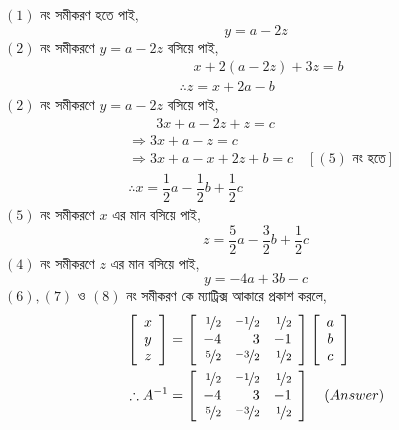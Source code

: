 $(1)$ নং সমীকরণ হতে পাই, 
\begin{equation}
	y=a-2z \tag{4}
\end{equation}
$(2)$ নং সমীকরণে $y=a-2z$ বসিয়ে পাই, 
\begin{align}
	& \quad x+2(a-2z)+3z=b \nonumber \\
	& \therefore z=x+2a-b \tag{5}
\end{align}
$(2)$ নং সমীকরণে $y=a-2z$ বসিয়ে পাই, 
\begin{align}
	& \quad \quad 3x+a-2z+z=c \nonumber \\
	& \Rightarrow 3x+a-z=c \nonumber \\
	& \Rightarrow 3x+a-x+2z+b=c \quad [(5) \text{ নং হতে}] \nonumber \\
	& \therefore x=\dfrac{1}{2}a-\dfrac{1}{2}b+\dfrac{1}{2}c \tag{6}
\end{align}
$(5)$ নং সমীকরণে $x$ এর মান বসিয়ে পাই, 
\begin{equation}
	z=\dfrac{5}{2}a-\dfrac{3}{2}b+\dfrac{1}{2}c \tag{7}
\end{equation}
$(4)$ নং সমীকরণে $z$ এর মান বসিয়ে পাই, 
\begin{equation}
	y=-4a+3b-c \tag{8}
\end{equation}
$(6),(7)$ ও $(8)$ নং সমীকরণ কে ম্যাট্রিক্স আকারে প্রকাশ করলে,
\begin{align*}
	\left[\begin{array}{c}
	x \\
	y \\
	z
	\end{array}\right] &= \left[\begin{array}{rrr}
	\nicefrac{1}{2} & \nicefrac{-1}{2} & \nicefrac{1}{2} \\
	-4 & 3 & -1 \\
	\nicefrac{5}{2} & \nicefrac{-3}{2} & \nicefrac{1}{2}
	\end{array}\right]\left[\begin{array}{c}
	a \\
	b \\
	c
	\end{array}\right] \\
	\therefore A^{-1} &= \left[\begin{array}{rrr}
	\nicefrac{1}{2} & \nicefrac{-1}{2} & \nicefrac{1}{2} \\
	-4 & 3 & -1 \\
	\nicefrac{5}{2} & \nicefrac{-3}{2} & \nicefrac{1}{2}
	\end{array}\right] \quad (Answer)
\end{align*}

